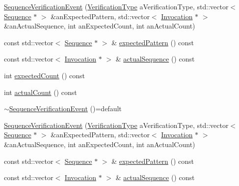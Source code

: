 \begin{DoxyCompactItemize}
\item 
\mbox{\hyperlink{structfakeit_1_1SequenceVerificationEvent_ab0842bb20a84757c265ecdee00f41c91}{Sequence\+Verification\+Event}} (\mbox{\hyperlink{namespacefakeit_a9df22520dd60badb149c1d1d2518b253}{Verification\+Type}} a\+Verification\+Type, std\+::vector$<$ \mbox{\hyperlink{classfakeit_1_1Sequence}{Sequence}} $\ast$ $>$ \&an\+Expected\+Pattern, std\+::vector$<$ \mbox{\hyperlink{structfakeit_1_1Invocation}{Invocation}} $\ast$ $>$ \&an\+Actual\+Sequence, int an\+Expected\+Count, int an\+Actual\+Count)
\item 
const std\+::vector$<$ \mbox{\hyperlink{classfakeit_1_1Sequence}{Sequence}} $\ast$ $>$ \& \mbox{\hyperlink{structfakeit_1_1SequenceVerificationEvent_a2d3fb35082acdadfe2be2a4d69c94189}{expected\+Pattern}} () const
\item 
const std\+::vector$<$ \mbox{\hyperlink{structfakeit_1_1Invocation}{Invocation}} $\ast$ $>$ \& \mbox{\hyperlink{structfakeit_1_1SequenceVerificationEvent_aecdc4dac839dc16a96ee85b0d0297bed}{actual\+Sequence}} () const
\item 
int \mbox{\hyperlink{structfakeit_1_1SequenceVerificationEvent_ad0970b6b1b3b3d122e0494e95c6a00eb}{expected\+Count}} () const
\item 
int \mbox{\hyperlink{structfakeit_1_1SequenceVerificationEvent_a4f7daa947cca317c30e74ee66540d3b9}{actual\+Count}} () const
\item 
\mbox{\hyperlink{structfakeit_1_1SequenceVerificationEvent_a8f8e45c2407802e200befa82790c5e13}{$\sim$\+Sequence\+Verification\+Event}} ()=default
\item 
\mbox{\hyperlink{structfakeit_1_1SequenceVerificationEvent_ab0842bb20a84757c265ecdee00f41c91}{Sequence\+Verification\+Event}} (\mbox{\hyperlink{namespacefakeit_a9df22520dd60badb149c1d1d2518b253}{Verification\+Type}} a\+Verification\+Type, std\+::vector$<$ \mbox{\hyperlink{classfakeit_1_1Sequence}{Sequence}} $\ast$ $>$ \&an\+Expected\+Pattern, std\+::vector$<$ \mbox{\hyperlink{structfakeit_1_1Invocation}{Invocation}} $\ast$ $>$ \&an\+Actual\+Sequence, int an\+Expected\+Count, int an\+Actual\+Count)
\item 
const std\+::vector$<$ \mbox{\hyperlink{classfakeit_1_1Sequence}{Sequence}} $\ast$ $>$ \& \mbox{\hyperlink{structfakeit_1_1SequenceVerificationEvent_a2d3fb35082acdadfe2be2a4d69c94189}{expected\+Pattern}} () const
\item 
const std\+::vector$<$ \mbox{\hyperlink{structfakeit_1_1Invocation}{Invocation}} $\ast$ $>$ \& \mbox{\hyperlink{structfakeit_1_1SequenceVerificationEvent_aecdc4dac839dc16a96ee85b0d0297bed}{actual\+Sequence}} () const

\end{DoxyCompactItemize}
